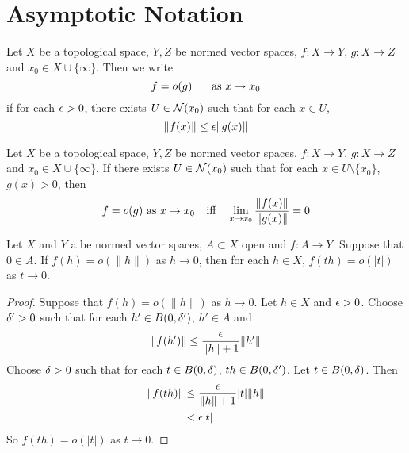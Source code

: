 \documentclass{book}
\begin{document}
\newpage	

\chapter{Asymptotic Notation}

\begin{defn} \ld{}
	Let $X$ be a topological space, $Y, Z$ be normed vector spaces, $f:X \rightarrow Y$, $g: X \rightarrow Z$ and $x_0 \in X \cup \{\infty\}$. Then we write $$f = o(g) \hspace{.5cm} \text{ as } x \rightarrow x_0$$ if for each $\epsilon >0$, there exists $U \in \mathcal{N}(x_0)$ such that for each $x \in U$, $$\|f(x)\| \leq \epsilon\|g(x)\|$$
\end{defn}

\begin{ex} \lex{}
	Let $X$ be a topological space, $Y, Z$ be normed vector spaces, $f:X \rightarrow Y$, $g: X \rightarrow Z$ and $x_0 \in X \cup \{\infty\}$. If there exists $U \in \mathcal{N}(x_0)$ such that for each $x \in U \setminus \{x_0\}$, $g(x) > 0$, then $$f = o(g) \text{ as } x \rightarrow x_0 \hspace{.25cm} \text{ iff } \hspace{.25cm}  \lim_{x \rightarrow x_0} \frac{\| f(x) \|}{\| g(x) \|} = 0$$
\end{ex}	

\begin{ex} \lex{}
	Let $X$ and $Y$ a be normed vector spaces, $A \subset X$ open and $f:A \rightarrow Y$. Suppose that $0 \in A$. If $f(h) = o(\|h\|)$ as $h \rightarrow 0$, then for each $h \in X$,  $f(th) = o(|t|)$ as $t \rightarrow 0$.
\end{ex}	

\begin{proof}
	Suppose that $f(h) = o(\|h\|)$ as $h \rightarrow 0$.  Let $h \in X$ and $\epsilon >0$. Choose $\delta' >0 $ such that for each $h' \in B(0, \delta')$, $h' \in A$ and 
	$$\|f(h')\| \leq \frac{\epsilon}{\|h\|+1} \|h'\|$$ 
	Choose $\delta >0$ such that for each $t \in B(0,\delta)$, $th \in B(0,\delta')$. Let $t \in B(0,\delta)$. Then 
	\begin{align*}
		\|f(th)\| 
		&\leq \frac{\epsilon}{\|h\|+1} |t|\|h\| \\
		&< \epsilon |t|
	\end{align*}
	So $f(th) = o(|t|)$ as $t \rightarrow 0$.
\end{proof}		
\end{document}
